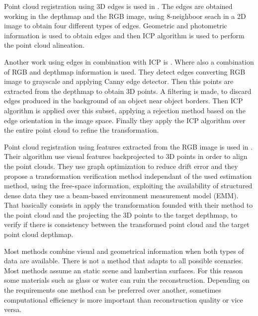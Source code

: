Point cloud registration using 3D edges is used in \cite{choi13}. The edges are obtained working in the depthmap and the RGB image, 
using 8-neighboor seach in a 2D image to obtain four different types of edges. Geometric and photometric information is used to 
obtain edges and then ICP algorithm is used to perform the point cloud alineation.  


Another work using edges in combination with ICP is \cite{dryan2012}. Where also a combination of RGB and depthmap information is 
used. They detect edges converting RGB image to grayscale and applying Canny edge detector. Then this points are extracted from 
the depthmap to obtain 3D points. A filtering is made, to discard edges produced in the background of an object near object borders. 
Then ICP algorithm is applied over this subset, applying a rejection method based on the edge orientation in the image space. Finally 
they apply the ICP algorithm over the entire point cloud to refine the transformation.

Point cloud registration using features extracted from the RGB image is used in \cite{endres13}. Their algorithm use visual features 
backprojected to 3D points in order to align the point clouds. They use graph optimization to reduce drift error and they propose a 
transformation verification method independant of the used estimation method, using the free-space information,
exploiting the availability of structured dense data they use a beam-based environment measurement model (EMM). That basically consists 
in apply the transformation founded with their method to the point cloud and the projecting the 3D points to the target depthmap, 
to verify if there is consistency 
between the transformed point cloud and the target point cloud depthmap.


Most methods combine visual and geometrical information when both types of data are available. There is not a method 
that adapts to all possible scenaries. Most methods assume an static scene and lambertian 
surfaces. For this reason some materials such as glass or water can ruin the reconstruction. 
Depending on the requirements one method can be preferred 
over another, sometimes computational efficiency is more important than reconstruction quality or vice versa.










